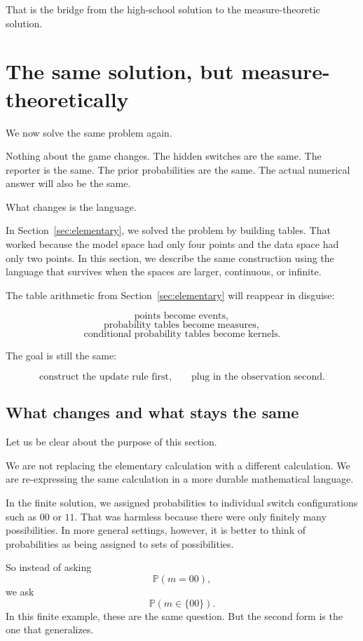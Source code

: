 \documentclass[11pt]{article}
\begin{document}
That is the bridge from the high-school solution to the measure-theoretic solution.

\section{The same solution, but measure-theoretically}
\label{sec:measure}

We now solve the same problem again.

Nothing about the game changes. The hidden switches are the same. The reporter is the same. The prior probabilities are the same. The actual numerical answer will also be the same.

What changes is the language.

In Section~\ref{sec:elementary}, we solved the problem by building tables. That worked because the model space had only four points and the data space had only two points. In this section, we describe the same construction using the language that survives when the spaces are larger, continuous, or infinite.

The table arithmetic from Section~\ref{sec:elementary} will reappear in disguise:

\[
    \text{points become events},
\]
\[
    \text{probability tables become measures},
\]
\[
    \text{conditional probability tables become kernels}.
\]

The goal is still the same:

\[
    \text{construct the update rule first,}
    \qquad
    \text{plug in the observation second.}
\]

\subsection{What changes and what stays the same}

Let us be clear about the purpose of this section.

We are not replacing the elementary calculation with a different calculation. We are re-expressing the same calculation in a more durable mathematical language.

In the finite solution, we assigned probabilities to individual switch configurations such as \(00\) or \(11\). That was harmless because there were only finitely many possibilities. In more general settings, however, it is better to think of probabilities as being assigned to sets of possibilities.

So instead of asking
\[
    \mathbb{P}(m=00),
\]
we ask
\[
    \mathbb{P}(m\in \{00\}).
\]
In this finite example, these are the same question. But the second form is the one that generalizes.
\end{document}

